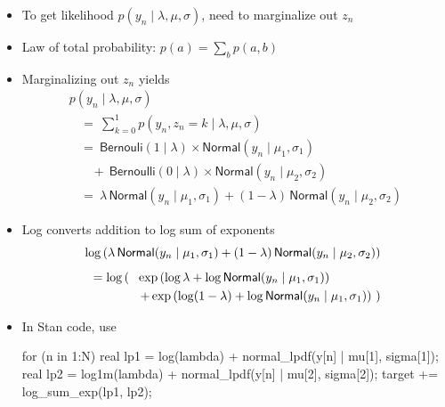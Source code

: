 \documentclass[10pt]{report}
\begin{document}
%
\begin{itemize}
\item To get likelihood $p(y_n \mid \lambda, \mu, \sigma)$, need to
  marginalize out $z_n$
\item Law of total probability: $p(a) = \sum_{b} p(a, b)$
\item Marginalizing out $z_n$ yields
{\small
\[
\begin{array}{l}
p(y_n \mid \lambda, \mu, \sigma)
\\[8pt]
\ \ \ \ = \
\sum_{k=0}^1 p(y_n, z_n = k \mid \lambda, \mu, \sigma)
\\[8pt]
\ \ \ \ = \
\mathsf{Bernouli}(1 \mid \lambda)
          \times \mathsf{Normal}(y_n \mid \mu_1, \sigma_1)
\\[4pt]
\ \ \ \ \ \ \ \      + \ \mathsf{Bernoulli}(0 \mid \lambda)
            \times  \mathsf{Normal}(y_n \mid \mu_2, \sigma_2)
\\[8pt]
\ \ \ \ = \
\lambda
    \, \mathsf{Normal}(y_n \mid \mu_1, \sigma_1)
+ (1 - \lambda)
      \, \mathsf{Normal}(y_n \mid  \mu_2, \sigma_2)
\end{array}
\]
}
\end{itemize}


%
\begin{itemize}
\item Log converts addition to log sum of exponents
\[
\begin{array}{l}
\log \left( \lambda
    \, \mathsf{Normal}(y_n \mid \mu_1, \sigma_1)
+ (1 - \lambda)
      \, \mathsf{Normal}(y_n \mid  \mu_2, \sigma_2) \right)
\\[8pt]
\ \ = \log \left( \right.
\begin{array}[t]{l}
\exp \left( \log \lambda + \log \mathsf{Normal}(y_n \mid
  \mu_1, \sigma_1) \right)
\\[3pt]
\left. + \exp \left( \log (1 - \lambda) + \log \mathsf{Normal}(y_n \mid
  \mu_1, \sigma_1) \right) \ \right)
\end{array}
\end{array}
\]
\item In Stan code, use 
\begin{stancode}
for (n in 1:N) {
  real lp1 = log(lambda)
             + normal_lpdf(y[n] | mu[1], sigma[1]);
  real lp2 = log1m(lambda)
             + normal_lpdf(y[n] | mu[2], sigma[2]);
  target += log_sum_exp(lp1, lp2);
}
\end{stancode}

\end{itemize}
\end{document}
